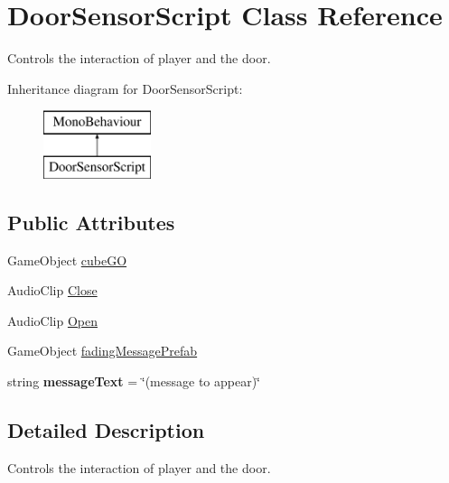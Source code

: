 \hypertarget{class_door_sensor_script}{\section{Door\-Sensor\-Script Class Reference}
\label{class_door_sensor_script}
}


Controls the interaction of player and the door.  


Inheritance diagram for Door\-Sensor\-Script\-:\begin{figure}[H]
\begin{center}
\leavevmode
\includegraphics[height=2.000000cm]{class_door_sensor_script}
\end{center}
\end{figure}
\subsection*{Public Attributes}
\begin{DoxyCompactItemize}
\item 
Game\-Object \hyperlink{class_door_sensor_script_a3ac7f794c8f0553a80a7ff9f5ea1717a}{cube\-G\-O}
\item 
Audio\-Clip \hyperlink{class_door_sensor_script_a8cdc54e500df0194633b1aa6830460a9}{Close}
\item 
Audio\-Clip \hyperlink{class_door_sensor_script_a5e5b72d9a89f93da35dcd2377f0435c0}{Open}
\item 
Game\-Object \hyperlink{class_door_sensor_script_abeeac4e7d1793824f6eacb8939e746be}{fading\-Message\-Prefab}
\item 
\hypertarget{class_door_sensor_script_a481e3e75882a1f9e4c382bd134d0ba14}{string {\bfseries message\-Text} = \char`\"{}(message to appear)\char`\"{}}\label{class_door_sensor_script_a481e3e75882a1f9e4c382bd134d0ba14}

\end{DoxyCompactItemize}


\subsection{Detailed Description}
Controls the interaction of player and the door. 

